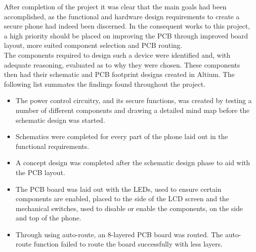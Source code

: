 	After completion of the project it was clear that the main goals had been accomplished, as the functional and hardware design requirements to create a secure phone had indeed been discerned. In the consequent works to this project, a high priority should be placed on improving the PCB through improved board layout, more suited component selection and PCB routing. \\
The components required to design such a device were identified and, with adequate reasoning, evaluated as to why they were chosen. 
These components then had their schematic and PCB footprint designs created in Altium. 
The following list summates the findings found throughout the project.\\

\begin{itemize}
\item The power control circuitry, and its secure functions, was created by testing a number of different components and drawing a detailed mind map before the schematic design was started.
\item Schematics were completed for every part of the phone laid out in the functional requirements.
\item A concept design was completed after the schematic design phase to aid with the PCB layout. 
\item The PCB board was laid out with the LEDs, used to ensure certain components are enabled, placed to the side of the LCD screen and the mechanical switches, used to disable or enable the components, on the side and top of the phone. 
\item Through using auto-route, an 8-layered PCB board was routed. 
The auto-route function failed to route the board successfully with less layers. 
\end{itemize}






